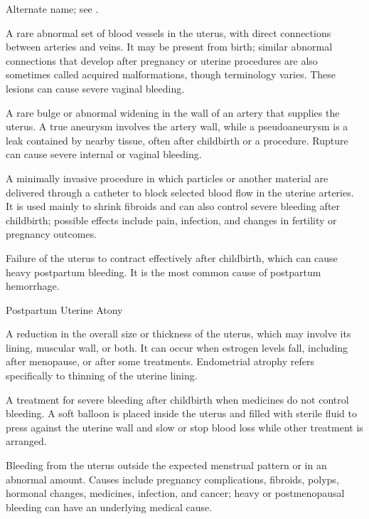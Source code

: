  Alternate name; see .

 A rare abnormal set of blood vessels in the uterus,
with direct connections between arteries and veins. It may be present from birth; similar abnormal
connections that develop after pregnancy or uterine procedures are also sometimes called acquired
malformations, though terminology varies. These lesions can cause severe vaginal bleeding.

 A rare bulge or abnormal widening in the wall of an artery that
supplies the uterus. A true aneurysm involves the artery wall, while a pseudoaneurysm is a leak
contained by nearby tissue, often after childbirth or a procedure. Rupture can cause severe internal
or vaginal bleeding.

 A minimally invasive procedure in which particles or another material are delivered through a catheter to block selected blood flow in the uterine arteries. It is used mainly to shrink fibroids and can also control severe bleeding after childbirth; possible effects include pain, infection, and changes in fertility or pregnancy outcomes.

 Failure of the uterus to contract effectively after childbirth, which can cause heavy postpartum bleeding. It is the most common cause of postpartum hemorrhage.

\synonyms
Postpartum Uterine Atony

 A reduction in the overall size or thickness of the uterus, which may
involve its lining, muscular wall, or both. It can occur when estrogen levels fall, including after
menopause, or after some treatments. Endometrial atrophy refers specifically to thinning of the
uterine lining.

 A treatment for severe bleeding after childbirth when medicines do not control bleeding. A soft balloon is placed inside the uterus and filled with sterile fluid to press against the uterine wall and slow or stop blood loss while other treatment is arranged.

 Bleeding from the uterus outside the expected menstrual pattern or in an abnormal amount. Causes include pregnancy complications, fibroids, polyps, hormonal changes, medicines, infection, and cancer; heavy or postmenopausal bleeding can have an underlying medical cause.

